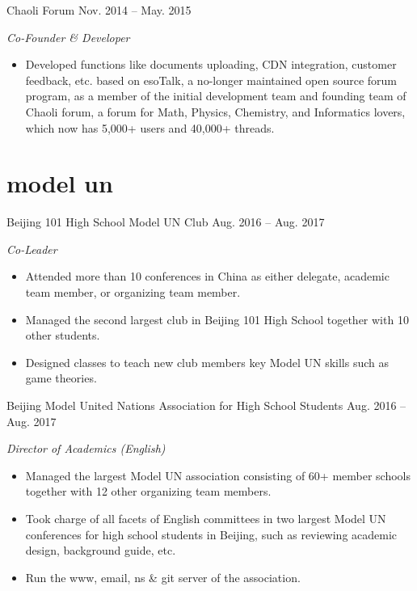 \documentclass[hidelinks__VERSION__]{adamyi-cv} %
\begin{document}
\begin{entrylist}
\entry
{Chaoli Forum}
{Nov. 2014 -- May. 2015}
{\emph{Co-Founder \& Developer}
\begin{itemize}
\item Developed functions like documents uploading, CDN integration, customer feedback, etc. based on esoTalk, a no-longer maintained open source forum program, as a member of the initial development team and founding team of Chaoli forum, a forum for Math, Physics, Chemistry, and Informatics lovers, which now has 5,000+ users and 40,000+ threads.
\end{itemize}}


\end{entrylist}


\section{model un}

\begin{entrylist}


\entry
{Beijing 101 High School Model UN Club}
{Aug. 2016 -- Aug. 2017}
{\emph{Co-Leader}
\begin{itemize}
\item Attended more than 10 conferences in China as either delegate, academic team member, or organizing team member.
\item Managed the second largest club in Beijing 101 High School together with 10 other students.
\item Designed classes to teach new club members key Model UN skills such as game theories.
\end{itemize}}


\entry
{Beijing Model United Nations Association for High School Students}
{Aug. 2016 -- Aug. 2017}
{\emph{Director of Academics (English)}
\begin{itemize}
\item Managed the largest Model UN association consisting of 60+ member schools together with 12 other organizing team members.
\item Took charge of all facets of English committees in two largest Model UN conferences for high school students in Beijing, such as reviewing academic design, background guide, etc.
\item Run the www, email, ns \& git server of the association.
\end{itemize}}


\end{entrylist}
\end{document}
